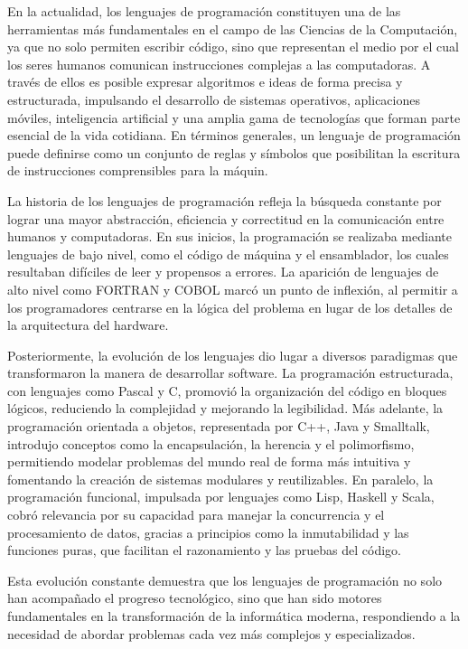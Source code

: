 \documentclass[a4paper,12pt]{article}
\begin{document}
En la actualidad, los lenguajes de programación constituyen una de las herramientas más fundamentales en el campo de las Ciencias de la Computación, ya que no solo permiten escribir código, sino que representan el medio por el cual los seres humanos comunican instrucciones complejas a las computadoras. A través de ellos es posible expresar algoritmos e ideas de forma precisa y estructurada, impulsando el desarrollo de sistemas operativos, aplicaciones móviles, inteligencia artificial y una amplia gama de tecnologías que forman parte esencial de la vida cotidiana. En términos generales, un lenguaje de programación puede definirse como un conjunto de reglas y símbolos que posibilitan la escritura de instrucciones comprensibles para la máquin.

La historia de los lenguajes de programación refleja la búsqueda constante por lograr una mayor abstracción, eficiencia y correctitud en la comunicación entre humanos y computadoras. En sus inicios, la programación se realizaba mediante lenguajes de bajo nivel, como el código de máquina y el ensamblador, los cuales resultaban difíciles de leer y propensos a errores. La aparición de lenguajes de alto nivel como FORTRAN y COBOL marcó un punto de inflexión, al permitir a los programadores centrarse en la lógica del problema en lugar de los detalles de la arquitectura del hardware.\cite{IBMFortran,IBMCobol}

Posteriormente, la evolución de los lenguajes dio lugar a diversos paradigmas que transformaron la manera de desarrollar software. La programación estructurada, con lenguajes como Pascal y C, promovió la organización del código en bloques lógicos, reduciendo la complejidad y mejorando la legibilidad. Más adelante, la programación orientada a objetos, representada por C++, Java y Smalltalk, introdujo conceptos como la encapsulación, la herencia y el polimorfismo, permitiendo modelar problemas del mundo real de forma más intuitiva y fomentando la creación de sistemas modulares y reutilizables. En paralelo, la programación funcional, impulsada por lenguajes como Lisp, Haskell y Scala, cobró relevancia por su capacidad para manejar la concurrencia y el procesamiento de datos, gracias a principios como la inmutabilidad y las funciones puras, que facilitan el razonamiento y las pruebas del código.\cite{OpenStax}

Esta evolución constante demuestra que los lenguajes de programación no solo han acompañado el progreso tecnológico, sino que han sido motores fundamentales en la transformación de la informática moderna, respondiendo a la necesidad de abordar problemas cada vez más complejos y especializados.
\end{document}
